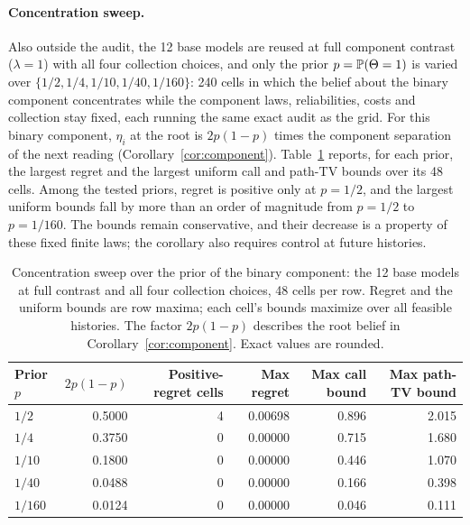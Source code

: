 \paragraph{Concentration sweep.}
Also outside the audit, the 12 base models are reused at full component
contrast ($\lambda=1$) with all four collection choices, and only the prior
$p=\mathbb{P}(\Theta=1)$ is varied over $\{1/2,1/4,1/10,1/40,1/160\}$: 240 cells
in which the belief about the binary component concentrates while the
component laws, reliabilities, costs and collection stay fixed, each running
the same exact audit as the grid. For this binary component, $\eta_i$ at the
root is $2p(1-p)$ times the component separation of the next reading
(Corollary~\ref{cor:component}). Table~\ref{tab:concentration} reports, for
each prior, the largest regret and the largest uniform call and path-TV bounds
over its 48 cells. Among the tested priors, regret is positive only at $p=1/2$,
and the largest uniform bounds fall by more than an order of magnitude from
$p=1/2$ to $p=1/160$. The bounds remain conservative, and their decrease is a property of
these fixed finite laws; the corollary also requires control at future histories.

\begin{table}[htb]
\centering\small
\begin{tabular}{lrrrrr}
\toprule
Prior $p$ & $2p(1-p)$ & Positive-regret cells & Max regret & Max call bound & Max path-TV bound \\
\midrule
$1/2$ & 0.5000 & 4 & 0.00698 & 0.896 & 2.015 \\
$1/4$ & 0.3750 & 0 & 0.00000 & 0.715 & 1.680 \\
$1/10$ & 0.1800 & 0 & 0.00000 & 0.446 & 1.070 \\
$1/40$ & 0.0488 & 0 & 0.00000 & 0.166 & 0.398 \\
$1/160$ & 0.0124 & 0 & 0.00000 & 0.046 & 0.111 \\
\bottomrule
\end{tabular}
\caption{Concentration sweep over the prior of the binary component: the 12
base models at full contrast and all four collection choices, 48 cells per row.
Regret and the uniform bounds are row maxima; each cell's bounds maximize over
all feasible histories. The factor $2p(1-p)$ describes the root belief in
Corollary~\ref{cor:component}. Exact values are rounded.}
\label{tab:concentration}
\end{table}

